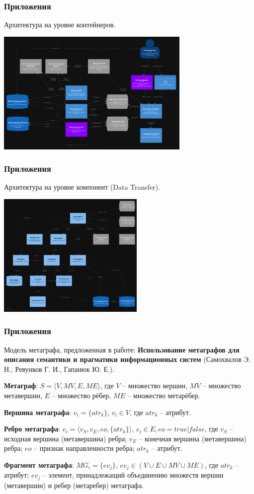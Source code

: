 \documentclass[pdf, hyperref={unicode}, aspectratio=169]{beamer}
\begin{document}
\begin{frame}
\frametitle{Приложения}
	Архитектура на уровне контейнеров.

	\begin{center}
		\includegraphics[height = 6cm]{img/structurizr-Containers}
	\end{center}
\end{frame}


\begin{frame}
\frametitle{Приложения}
	Архитектура на уровне компонент (Data Transfer).

	\begin{center}
		\includegraphics[height = 6cm]{img/structurizr-DataTransferComponents}
	\end{center}
\end{frame}


\begin{frame}
\frametitle{Приложения}
	Модель метаграфа, предложенная в работе: \textbf{Использование метаграфов для описания семантики и прагматики информационных систем} (Самохвалов Э. Н., Ревунков Г. И., Гапанюк Ю. Е.).

	\textbf{Метаграф}: $S = \langle V, MV, E, ME \rangle$, где $V$ -- множество вершин, $MV$ -- множество метавершин, $E$ -- множество рёбер, $ME$ -- множество метарёбер.

	\textbf{Вершина метаграфа}: $v_i = \{ atr_k \}$, $v_i \in V$, где $atr_k$ -- атрибут.

	\textbf{Ребро метаграфа}: $e_i = \langle v_S, v_E, eo, \{ atr_k \} \rangle$, $e_i \in E, eo = true | false$, где $v_S$ -- исходная вершина (метавершина) ребра; $v_E$ -- конечная вершина (метавершина) ребра; $eo$ -- признак направленности ребра; $atr_k$ -- атрибут.

	\textbf{Фрагмент метаграфа}: $MG_i = \{ ev_j \}$, $ev_j \in (V \cup E \cup MV \cup ME)$, где $atr_k$ -- атрибут; $ev_j$ -- элемент, принадлежащий объединению множеств вершин (метавершин) и ребер (метаребер) метаграфа.
\end{frame}
\end{document}
